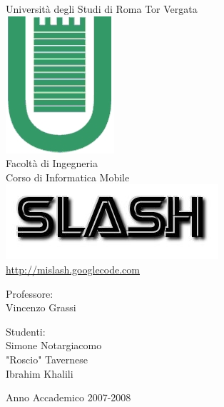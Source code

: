 \begin{titlepage}
\begin{center}
\LARGE{Università degli Studi di Roma Tor Vergata}\\
\vspace{10mm}
\includegraphics[scale=0.50]{etc/logo.jpg}\\
Facoltà di Ingegneria\\
\vspace{5mm}
\normalsize{Corso di Informatica Mobile}\\
\vspace{20mm}
\includegraphics[scale=0.60]{etc/slash.jpg}\\
\url{http://mislash.googlecode.com}\\
\end{center}
\vspace{40mm}
\begin{minipage}[t]{0.30\textwidth}
\begin{center}
{\normalsize{Professore:\\
Vincenzo Grassi}}
\end{center}
\end{minipage}
\hfill
\begin{minipage}[t]{0.30\textwidth}
\begin{center}
{\normalsize{Studenti:\\
Simone Notargiacomo\\
"Roscio" Tavernese\\
Ibrahim Khalili}}
\end{center}
\end{minipage}
\vspace{10mm}
\begin{center}
Anno Accademico 2007-2008
\end{center}

\end{titlepage}